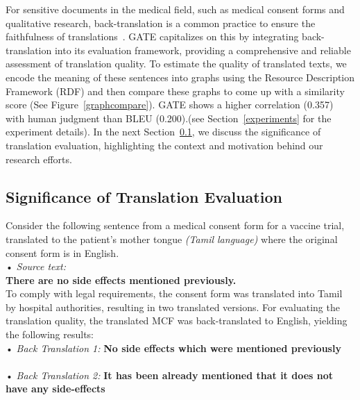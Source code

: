 \documentclass[runningheads]{llncs}
\begin{document}
For sensitive documents in the medical field, such as medical consent forms and qualitative research, back-translation is a common practice to ensure the faithfulness of translations~\cite{whyBT}\cite{whyBTMedical}. GATE capitalizes on this by integrating back-translation into its evaluation framework, providing a comprehensive and reliable assessment of translation quality. To estimate the quality of translated texts, we encode the meaning of these sentences into graphs using the Resource Description Framework (RDF) and then compare these graphs to come up with a similarity score (See Figure~\ref{graphcompare}). GATE shows a higher correlation (0.357) with human judgment than BLEU (0.200).\@ (see Section~\ref{experiments} for the experiment details). In the next Section~\ref{whyevaluate}, we discuss the significance of translation evaluation, highlighting the context and motivation behind our research efforts. 


\subsection{Significance of Translation Evaluation}\label{whyevaluate}
Consider the following sentence from a medical consent form for a vaccine trial, translated to the patient’s mother tongue \textit{(Tamil language)} where the original consent form is in English.\\

• \textit{Source text: }\\\quad \textbf{There are no side effects mentioned previously.}\\

To comply with legal requirements, the consent form was translated into Tamil by hospital authorities, resulting in two translated versions. For evaluating the translation quality, the translated MCF was back-translated to English, yielding the following results:\\

\pagebreak
• \textit{Back Translation 1: }
\newline\quad\textbf{No side effects which were mentioned previously}
\\\\
• \textit{Back Translation 2: }
\newline\quad\textbf{It has been already mentioned that it does not have any side-effects}
\\
\end{document}
